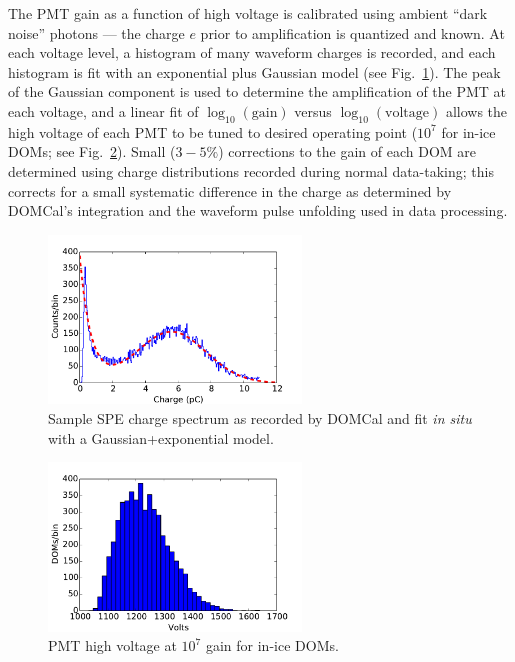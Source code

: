 The PMT gain as a function of high voltage is calibrated using ambient
``dark noise'' photons --- the charge $e$ prior to amplification is quantized
and known.  At each voltage level, a histogram of many waveform charges is recorded,
and each histogram is fit with an exponential plus Gaussian model (see
Fig.~\ref{fig:domcal_hvfit}).  The peak of the Gaussian component is used to
determine the amplification of the PMT at each voltage, and a linear fit
of $\log_{10}(\mathrm{gain})$ versus $\log_{10}(\mathrm{voltage})$ allows
the high voltage of each PMT to be tuned to desired operating point ($10^7$
for in-ice DOMs; see Fig.~\ref{fig:domcal_hv_settings}).  Small ($3-5\%$)
corrections to the gain of each DOM are determined using charge
distributions recorded during normal data-taking; this corrects for a small
systematic difference in the charge as determined by DOMCal's integration
and the waveform pulse unfolding used in data processing.

\begin{figure}[!h]
 \centering
 \includegraphics[width=0.6\textwidth]{graphics/dom/domcal/hvfit.pdf}
 \caption{Sample SPE charge spectrum as recorded by DOMCal and fit
   \textit{in situ} with a Gaussian+exponential model.} 
 \label{fig:domcal_hvfit}
\end{figure}

\begin{figure}[!h]
 \centering
 \includegraphics[width=0.6\textwidth]{graphics/dom/domcal/inice_hv_2016.pdf}
 \caption{PMT high voltage at $10^7$ gain for in-ice DOMs.}
 \label{fig:domcal_hv_settings}
\end{figure}

